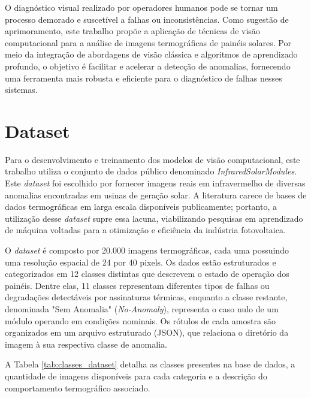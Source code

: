 \documentclass[a4paper,11pt]{article}
\begin{document}
O diagnóstico visual realizado por operadores humanos pode se tornar um processo demorado e suscetível a falhas ou inconsistências. Como sugestão de aprimoramento, este trabalho propõe a aplicação de técnicas de visão computacional para a análise de imagens termográficas de painéis solares. Por meio da integração de abordagens de visão clássica e algoritmos de aprendizado profundo, o objetivo é facilitar e acelerar a detecção de anomalias, fornecendo uma ferramenta mais robusta e eficiente para o diagnóstico de falhas nesses sistemas.
\clearpage

\section{Dataset}
Para o desenvolvimento e treinamento dos modelos de visão computacional, este trabalho utiliza o conjunto de dados público denominado \textit{InfraredSolarModules}. Este \textit{dataset} foi escolhido por fornecer imagens reais em infravermelho de diversas anomalias encontradas em usinas de geração solar. A literatura carece de bases de dados termográficas em larga escala disponíveis publicamente; portanto, a utilização desse \textit{dataset} supre essa lacuna, viabilizando pesquisas em aprendizado de máquina voltadas para a otimização e eficiência da indústria fotovoltaica.

O \textit{dataset} é composto por 20.000 imagens termográficas, cada uma possuindo uma resolução espacial de 24 por 40 pixels. Os dados estão estruturados e categorizados em 12 classes distintas que descrevem o estado de operação dos painéis. Dentre elas, 11 classes representam diferentes tipos de falhas ou degradações detectáveis por assinaturas térmicas, enquanto a classe restante, denominada "Sem Anomalia" (\textit{No-Anomaly}), representa o caso nulo de um módulo operando em condições nominais. Os rótulos de cada amostra são organizados em um arquivo estruturado (JSON), que relaciona o diretório da imagem à sua respectiva classe de anomalia.

A Tabela \ref{tab:classes_dataset} detalha as classes presentes na base de dados, a quantidade de imagens disponíveis para cada categoria e a descrição do comportamento termográfico associado.
\end{document}
